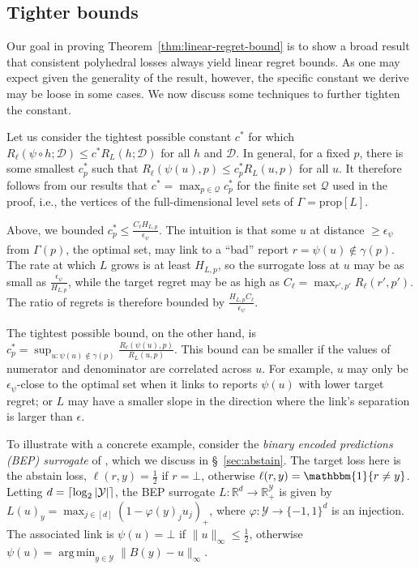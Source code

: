 \documentclass[twoside,11pt]{article}
\newcommand{\reals}{\mathbb{R}}
\newcommand{\prop}[1]{\mathrm{prop}[#1]}
\newcommand{\D}{\mathcal{D}}
\newcommand{\Y}{\mathcal{Y}}
\newcommand{\ones}{\mathbbm{1}}
\DeclarePairedDelimiter\ceil{\lceil}{\rceil}
\DeclareMathOperator*{\argmin}{arg\,min}
\begin{document}
\subsection{Tighter bounds}
\label{sec:regret-tighter-bounds}

Our goal in proving Theorem~\ref{thm:linear-regret-bound} is to show a broad result that consistent polyhedral losses always yield linear regret bounds.
As one may expect given the generality of the result, however, the specific constant we derive may be loose in some cases.
We now discuss some techniques to further tighten the constant.

Let us consider the tightest possible constant $c^*$ for which $R_{\ell}(\psi \circ h;\D) \leq c^* R_L(h;\D)$ for all $h$ and $\D$.
In general, for a fixed $p$, there is some smallest $c_p^*$ such that $R_{\ell}(\psi(u),p) \leq c_p^* R_L(u,p)$ for all $u$.
It therefore follows from our results that $c^* = \max_{p \in \mathcal{Q}} c_p^*$ for the finite set $\mathcal{Q}$ used in the proof, i.e., the vertices of the full-dimensional level sets of $\Gamma = \prop{L}$.

Above, we bounded $c_p^* \leq \frac{C_{\ell} H_{L,p}}{\epsilon_{\psi}}$.
The intuition is that some $u$ at distance $\geq \epsilon_{\psi}$ from $\Gamma(p)$, the optimal set, may link to a ``bad'' report $r = \psi(u) \not\in \gamma(p)$.
The rate at which $L$ grows is at least $H_{L,p}$, so the surrogate loss at $u$ may be as small as $\frac{\epsilon_{\psi}}{H_{L,p}}$, while the target regret may be as high as $C_{\ell} = \max_{r',p'} R_{\ell}(r',p')$.
The ratio of regrets is therefore bounded by $\frac{H_{L,p} C_{\ell}}{\epsilon_{\psi}}$.

The tightest possible bound, on the other hand, is $c_p^* = \sup_{u: \psi(u) \not\in \gamma(p)} \frac{R_{\ell}(\psi(u),p)}{R_L(u,p)}$.
This bound can be smaller if the values of numerator and denominator are correlated across $u$.
For example, $u$ may only be $\epsilon_{\psi}$-close to the optimal set when it links to reports $\psi(u)$ with lower target regret; or $L$ may have a smaller slope in the direction where the link's separation is larger than $\epsilon$.

To illustrate with a concrete example, consider the \emph{binary encoded predictions (BEP) surrogate} of \citet{ramaswamy2018consistent}, which we discuss in \S~\ref{sec:abstain}.
The target loss here is the abstain loss, $\ell(r,y) = \frac{1}{2}$ if $r = \bot$, otherwise $\ell(r,y) = \ones\{r \neq y\}$.
Letting $d = \ceil{\log_2 |\Y|}$, the BEP surrogate $L : \reals^d \to \reals^\Y_+$ is given by
$L(u)_y = \max_{j \in [d]} \left(1 - \varphi(y)_j u_j\right)_+$,
where $\varphi:\Y\to\{-1,1\}^d$ is an injection.
The associated link is $\psi(u) = \bot$ if $\|u\|_\infty \leq \tfrac{1}{2}$, otherwise $\psi(u) = \argmin_{y \in \Y} \|B(y) - u\|_{\infty}$.
\end{document}
